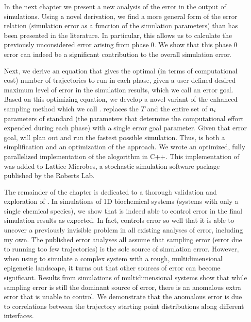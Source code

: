 In the next chapter we present a new analysis of the error in the output of  simulations. Using a novel derivation, we find a more general form of the  error relation (\ie simulation error as a function of the simulation parameters) than has been presented in the literature\supercite{Allen:2006ch,Borrero:2008il,Allen:2009kb}. In particular, this allows us to calculate the previously unconsidered error arising from phase $0$. We show that this phase $0$ error can indeed be a significant contribution to the overall simulation error.

Next, we derive an equation that gives the optimal (in terms of computational cost) number of trajectories to run in each phase, given a user-defined desired maximum level of error in the simulation results, which we call an error goal. Based on this optimizing equation, we develop a novel variant of the  enhanced sampling method which we call .  replaces the $T$ and the entire set of $n_{i}$ parameters of standard  (\ie the parameters that determine the computational effort expended during each phase) with a single error goal parameter. Given that error goal,  will plan out and run the fastest possible  simulation. Thus,  is both a simplification and an optimization of the  approach. We wrote an optimized, fully parallelized implementation of the  alogorithm in C++. This implementation of  was added to Lattice Microbes\supercite{Roberts:2013cu}, a stochastic simulation software package published by the Roberts Lab.

The remainder of the chapter is dedicated to a thorough validation and exploration of . In simulations of 1D biochemical systems (\ie systems with only a single chemical species), we show that  is indeed able to control error in the final simulation results as expected. In fact,  controls error so well that it is able to uncover a previously invisible problem in all existing analyses of  error, including my own. The published error analyses\supercite{Allen:2006ch,Borrero:2008il,Allen:2009kb} all assume that sampling error (\ie error due to running too few trajectories) is the sole source of simulation error. However, when using  to simulate a complex system with a rough, multidimensional epigenetic landscape, it turns out that other sources of error can become significant. Results from  simulations of multidimensional systems show that while sampling error is still the dominant source of error, there is an anomalous extra error that  is unable to control. We demonstrate that the anomalous error is due to correlations between the trajectory starting point distributions along different interfaces.

